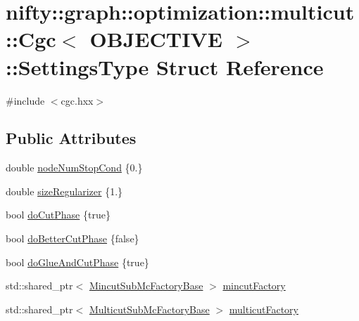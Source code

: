 \hypertarget{structnifty_1_1graph_1_1optimization_1_1multicut_1_1Cgc_1_1SettingsType}{}\section{nifty\+:\+:graph\+:\+:optimization\+:\+:multicut\+:\+:Cgc$<$ O\+B\+J\+E\+C\+T\+I\+V\+E $>$\+:\+:Settings\+Type Struct Reference}
\label{structnifty_1_1graph_1_1optimization_1_1multicut_1_1Cgc_1_1SettingsType}


{\ttfamily \#include $<$cgc.\+hxx$>$}

\subsection*{Public Attributes}
\begin{DoxyCompactItemize}
\item 
double \hyperlink{structnifty_1_1graph_1_1optimization_1_1multicut_1_1Cgc_1_1SettingsType_ae9427f6ec23229cc5e697504f73a7e4f}{node\+Num\+Stop\+Cond} \{0.\}
\item 
double \hyperlink{structnifty_1_1graph_1_1optimization_1_1multicut_1_1Cgc_1_1SettingsType_af336bc11dc1cd15a48db638d53dbc820}{size\+Regularizer} \{1.\}
\item 
bool \hyperlink{structnifty_1_1graph_1_1optimization_1_1multicut_1_1Cgc_1_1SettingsType_af9db56d926203b9f478407caee839699}{do\+Cut\+Phase} \{true\}
\item 
bool \hyperlink{structnifty_1_1graph_1_1optimization_1_1multicut_1_1Cgc_1_1SettingsType_adbe1702bcc70a18a26c13867f4c6fc1a}{do\+Better\+Cut\+Phase} \{false\}
\item 
bool \hyperlink{structnifty_1_1graph_1_1optimization_1_1multicut_1_1Cgc_1_1SettingsType_a7adf70d24844c4c1054ddd9865dc6f7e}{do\+Glue\+And\+Cut\+Phase} \{true\}
\item 
std\+::shared\+\_\+ptr$<$ \hyperlink{classnifty_1_1graph_1_1optimization_1_1multicut_1_1Cgc_a104f55e83ebbaf6451d0260210f0c7dc}{Mincut\+Sub\+Mc\+Factory\+Base} $>$ \hyperlink{structnifty_1_1graph_1_1optimization_1_1multicut_1_1Cgc_1_1SettingsType_a07f1cd60ae9a04187bce6539d7eae581}{mincut\+Factory}
\item 
std\+::shared\+\_\+ptr$<$ \hyperlink{classnifty_1_1graph_1_1optimization_1_1multicut_1_1Cgc_a5516da27348db37b794d25628deb9e82}{Multicut\+Sub\+Mc\+Factory\+Base} $>$ \hyperlink{structnifty_1_1graph_1_1optimization_1_1multicut_1_1Cgc_1_1SettingsType_a849d13bb72c6b517be3c45fad37a872a}{multicut\+Factory}
\end{DoxyCompactItemize}


